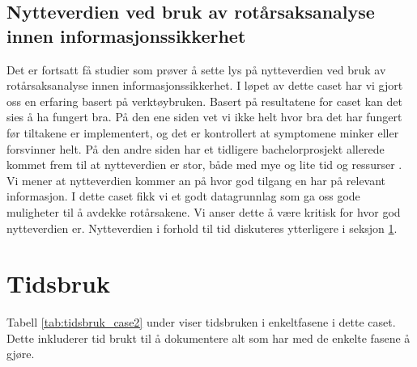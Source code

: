 \subsection{Nytteverdien ved bruk av rotårsaksanalyse innen informasjonssikkerhet}
Det er fortsatt få studier som prøver å sette lys på nytteverdien ved bruk av rotårsaksanalyse innen informasjonssikkerhet. I løpet av dette caset har vi gjort oss en erfaring basert på verktøybruken. Basert på resultatene for caset kan det sies å ha fungert bra. På den ene siden vet vi ikke helt hvor bra det har fungert før tiltakene er implementert, og det er kontrollert at symptomene minker eller forsvinner helt. På den andre siden har et tidligere bachelorprosjekt allerede kommet frem til at nytteverdien er stor, både med mye og lite tid og ressurser \cite{RCARapport}. Vi mener at nytteverdien kommer an på hvor god tilgang en har på relevant informasjon. I dette caset fikk vi et godt datagrunnlag som ga oss gode muligheter til å avdekke rotårsakene. Vi anser dette å være kritisk for hvor god nytteverdien er. Nytteverdien i forhold til tid diskuteres ytterligere i seksjon \ref{sek:tidsbruk_case2}. 

\section{Tidsbruk}
\label{sek:tidsbruk_case2}
Tabell \ref{tab:tidsbruk_case2} under viser tidsbruken i enkeltfasene i dette caset. Dette inkluderer tid brukt til å dokumentere alt som har med de enkelte fasene å gjøre. 

